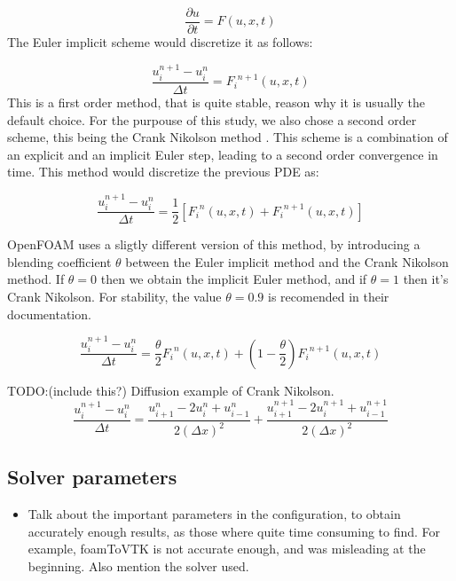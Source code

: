 \documentclass[
  english,        %
  font=times,     %
  onecolumn,      %
]{tumarticle}
\begin{document}
\begin{equation}
    \frac{\partial u}{\partial t} = F(u, x, t)
\end{equation}
The Euler implicit scheme would discretize it as follows:

\begin{equation}
    \frac{u_i^{n+1} - u_i^n}{\Delta t} = {F_i}^{n+1}(u, x, t)
\end{equation}
This is a first order method, that is quite stable, reason why it is usually the default choice. For the purpouse of this study, we also chose a second order scheme, this being the Crank Nikolson method \cite{crank1947practical}. This scheme is a combination of an explicit and an implicit Euler step, leading to a second order convergence in time. This method would discretize the previous PDE as: 

\begin{equation}
    \frac{u_i^{n+1} - u_i^n}{\Delta t} = \frac{1}{2} \left[{F_i}^{n}(u, x, t) +  {F_i}^{n+1}(u, x, t) \right]
\end{equation}


OpenFOAM uses a sligtly different version of this method, by introducing a blending coefficient $\theta$ between the Euler implicit method and the Crank Nikolson method. If $\theta = 0$ then we obtain the implicit Euler method, and if $\theta = 1$ then it's Crank Nikolson. For stability, the value $\theta = 0.9$ is recomended in their documentation.

\begin{equation}
    \frac{u_i^{n+1} - u_i^n}{\Delta t} = \frac{\theta}{2} {F_i}^{n}(u, x, t) + \left( 1 - \frac{\theta}{2} \right) {F_i}^{n+1}(u, x, t)
\end{equation}

 TODO:(include this?) Diffusion example of Crank Nikolson.
\begin{equation}
    \frac{u_i^{n+1} - u_i^{n}}{\Delta t} = \frac{u_{i + 1}^{n} - 2u_{i}^{n} + u_{i - 1}^{n}}{2 \left( \Delta x \right)^2} +  \frac{u_{i + 1}^{n + 1} - 2u_{i}^{n + 1} + u_{i - 1}^{n + 1}}{2 \left( \Delta x \right)^2}
\end{equation}


\subsection{Solver parameters}
\begin{itemize}
    \item Talk about the important parameters in the configuration, to obtain accurately enough results, as those where quite time consuming to find. For example, foamToVTK is not accurate enough, and was misleading at the beginning. Also mention the solver used.
\end{itemize}
\end{document}
